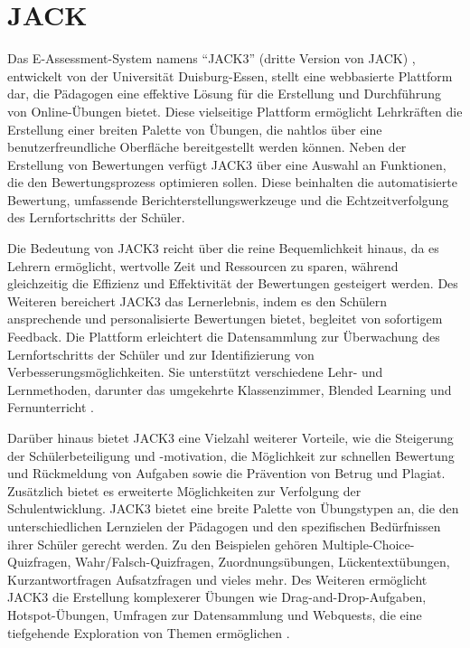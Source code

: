 \section{JACK}

Das E-Assessment-System namens ``JACK3'' (dritte Version von JACK) \cite{jack}, entwickelt von der Universität Duisburg-Essen, stellt eine webbasierte Plattform dar, die Pädagogen eine effektive Lösung für die Erstellung und Durchführung von Online-Übungen bietet. Diese vielseitige Plattform ermöglicht Lehrkräften die Erstellung einer breiten Palette von Übungen, die nahtlos über eine benutzerfreundliche Oberfläche bereitgestellt werden können. Neben der Erstellung von Bewertungen verfügt JACK3 über eine Auswahl an Funktionen, die den Bewertungsprozess optimieren sollen. Diese beinhalten die automatisierte Bewertung, umfassende Berichterstellungswerkzeuge und die Echtzeitverfolgung des Lernfortschritts der Schüler.

Die Bedeutung von JACK3 reicht über die reine Bequemlichkeit hinaus, da es Lehrern ermöglicht, wertvolle Zeit und Ressourcen zu sparen, während gleichzeitig die Effizienz und Effektivität der Bewertungen gesteigert werden. Des Weiteren bereichert JACK3 das Lernerlebnis, indem es den Schülern ansprechende und personalisierte Bewertungen bietet, begleitet von sofortigem Feedback. Die Plattform erleichtert die Datensammlung zur Überwachung des Lernfortschritts der Schüler und zur Identifizierung von Verbesserungsmöglichkeiten. Sie unterstützt verschiedene Lehr- und Lernmethoden, darunter das umgekehrte Klassenzimmer, Blended Learning und Fernunterricht \cite{jack}.

Darüber hinaus bietet JACK3 eine Vielzahl weiterer Vorteile, wie die Steigerung der Schülerbeteiligung und -motivation, die Möglichkeit zur schnellen Bewertung und Rückmeldung von Aufgaben sowie die Prävention von Betrug und Plagiat. Zusätzlich bietet es erweiterte Möglichkeiten zur Verfolgung der Schulentwicklung. JACK3 bietet eine breite Palette von Übungstypen an, die den unterschiedlichen Lernzielen der Pädagogen und den spezifischen Bedürfnissen ihrer Schüler gerecht werden. Zu den Beispielen gehören Multiple-Choice-Quizfragen, Wahr/Falsch-Quizfragen, Zuordnungsübungen, Lückentextübungen, Kurzantwortfragen Aufsatzfragen und vieles mehr. Des Weiteren ermöglicht JACK3 die Erstellung komplexerer Übungen wie Drag-and-Drop-Aufgaben, Hotspot-Übungen, Umfragen zur Datensammlung und Webquests, die eine tiefgehende Exploration von Themen ermöglichen \cite{jack}.

